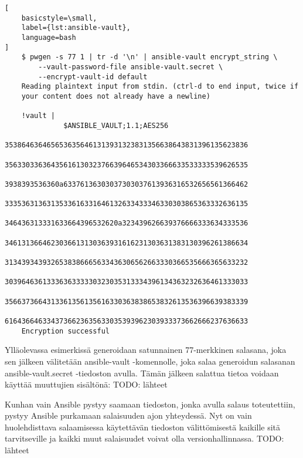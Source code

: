 \begin{lstlisting}[
    basicstyle=\small,
    label={lst:ansible-vault},
    language=bash
]
    $ pwgen -s 77 1 | tr -d '\n' | ansible-vault encrypt_string \
        --vault-password-file ansible-vault.secret \
        --encrypt-vault-id default
    Reading plaintext input from stdin. (ctrl-d to end input, twice if
    your content does not already have a newline)

    !vault |
              $ANSIBLE_VAULT;1.1;AES256
              3538646364656536356461313931323831356638643831396135623836
              3563303363643561613032376639646534303366633533333539626535
              3938393536360a63376136303037303037613936316532656561366462
              3335363136313533616331646132633433346330303865363332636135
              346436313331633664396532620a323439626639376666333634333536
              3461313664623036613130363931616231303631383130396261386634
              3134393439326538386665633436306562663330366535666365633232
              3039646361333636333330323035313334396134363232636461333033
              3566373664313361356135616330363838653832613536396639383339
              6164366463343736623635633035393962303933373662666237636633
    Encryption successful

\end{lstlisting}

Ylläolevassa esimerkissä generoidaan satunnainen 77-merkkinen salasana, joka
sen jälkeen välitetään ansible-vault -komennolle, joka salaa generoidun
salasanan ansible-vault.secret -tiedoston avulla. Tämän jälkeen salattua tietoa
voidaan käyttää muuttujien sisältönä:
TODO: lähteet



Kunhan vain Ansible pystyy saamaan tiedoston, jonka avulla salaus toteutettiin,
pystyy Ansible purkamaan salaisuuden ajon yhteydessä. Nyt on vain huolehdisttava
salaamisessa käytettävän tiedoston välittömisestä kaikille sitä tarvitseville ja
kaikki muut salaisuudet voivat olla versionhallinnassa.
TODO: lähteet
